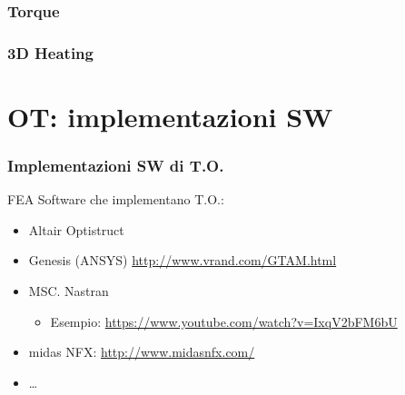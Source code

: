 \documentclass{beamer}
\begin{document}
\begin{frame}
	\frametitle{Torque}
	\centering
\end{frame}



\begin{frame}
	\frametitle{3D Heating}
	\centering
\end{frame}


\section{OT: implementazioni SW}

\begin{frame}
	\frametitle{Implementazioni SW di T.O.}
	
	FEA Software che implementano T.O.:
	\begin{itemize}
		\item Altair Optistruct
		\item Genesis (ANSYS) \url{http://www.vrand.com/GTAM.html}
		\item MSC. Nastran
		\begin{itemize}
			\item Esempio: \url{https://www.youtube.com/watch?v=IxqV2bFM6bU}
		\end{itemize}
		\item midas NFX: \url{http://www.midasnfx.com/}
		\item \ldots
	\end{itemize} 
\end{frame}
\end{document}

